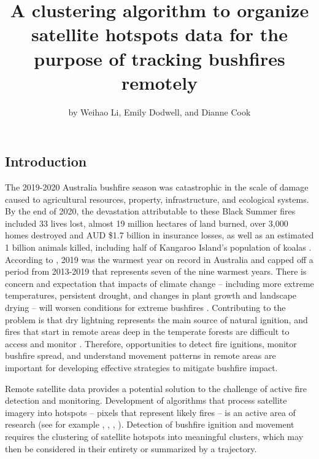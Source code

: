 \title{A clustering algorithm to organize satellite hotspots data for
the purpose of tracking bushfires remotely}
\author{by Weihao Li, Emily Dodwell, and Dianne Cook}

\maketitle


\hypertarget{introduction}{%
\subsection{Introduction}\label{introduction}}

The 2019-2020 Australia bushfire season was catastrophic in the scale of
damage caused to agricultural resources, property, infrastructure, and
ecological systems. By the end of 2020, the devastation attributable to
these Black Summer fires included 33 lives lost, almost 19 million
hectares of land burned, over 3,000 homes destroyed and AUD \$1.7
billion in insurance losses, as well as an estimated 1 billion animals
killed, including half of Kangaroo Island's population of koalas
\citep{Filkov2020}. According to \citet{climate2020}, 2019 was the
warmest year on record in Australia and capped off a period from
2013-2019 that represents seven of the nine warmest years. There is
concern and expectation that impacts of climate change -- including more
extreme temperatures, persistent drought, and changes in plant growth
and landscape drying -- will worsen conditions for extreme bushfires
\citep[\citet{Deb2020}]{climate2020}. Contributing to the problem is
that dry lightning represents the main source of natural ignition, and
fires that start in remote areas deep in the temperate forests are
difficult to access and monitor \citep{Abram2021}. Therefore,
opportunities to detect fire ignitions, monitor bushfire spread, and
understand movement patterns in remote areas are important for
developing effective strategies to mitigate bushfire impact.

Remote satellite data provides a potential solution to the challenge of
active fire detection and monitoring. Development of algorithms that
process satellite imagery into hotspots -- pixels that represent likely
fires -- is an active area of research (see for example
\citet{Giglio2016}, \citet{Xu2017}, \citet{Wickramasinghe2016},
\citet{Jang2019}). Detection of bushfire ignition and movement requires
the clustering of satellite hotspots into meaningful clusters, which may
then be considered in their entirety or summarized by a trajectory.


